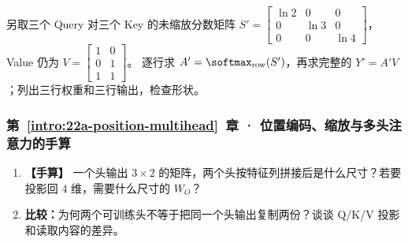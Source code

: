 \begin{enumerate}[label={},leftmargin=4.8em,itemsep=4pt]
另取三个 Query 对三个 Key 的未缩放分数矩阵
$S'=\begin{bmatrix}\ln2&0&0\\0&\ln3&0\\0&0&\ln4\end{bmatrix}$，
Value 仍为
$V=\begin{bmatrix}1&0\\0&1\\1&1\end{bmatrix}$。
逐行求 $A'=\softmax_{\rm row}(S')$，再求完整的
$Y'=A'V$；列出三行权重和三行输出，检查形状。
\end{enumerate}
\subsubsection*{第~\ref*{intro:22a-position-multihead}~章 · 位置编码、缩放与多头注意力的手算}
\begin{enumerate}[label={},leftmargin=4.8em,itemsep=4pt]
\item[\textbf{C-065.}] \leavevmode{}\label{exercise:C-065}\label{exercise:head-concatenation}\textbf{【手算】} 一个头输出 $3\times2$ 的矩阵，两个头按特征列拼接后是什么尺寸？若要投影回 4 维，需要什么尺寸的 $W_O$？
\item[\textbf{C-066.}] \leavevmode{}\label{exercise:C-066}\label{exercise:head-projection-diversity}\textbf{比较：}为何两个可训练头不等于把同一个头输出复制两份？谈谈 Q/K/V 投影和读取内容的差异。
\end{enumerate}
